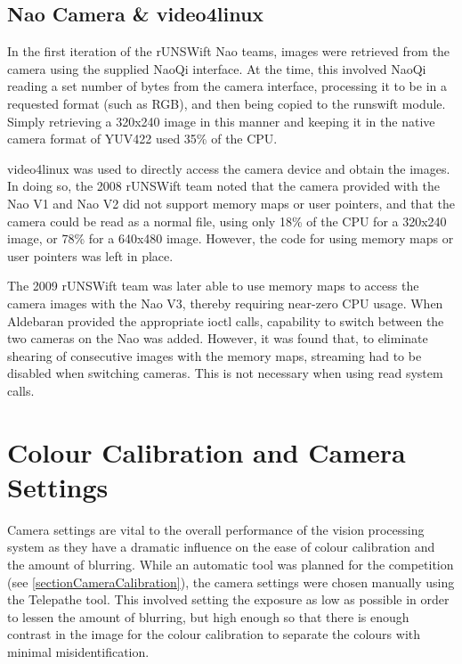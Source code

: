 \documentclass[pdftex,11pt,a4paper]{report}
\begin{document}
\begin{notesfornextyear}
\section{Nao Camera \& video4linux}
In the first iteration of the rUNSWift Nao teams, images were retrieved from
the camera using the supplied NaoQi interface.  At the time, this involved
NaoQi reading a set number of bytes from the camera interface, processing it to
be in a requested format (such as RGB), and then being copied to the
runswift module.  Simply retrieving a 320x240 image in this manner and keeping
it in the native camera format of YUV422 used 35\% of the CPU.

video4linux was used to directly access the camera device and obtain the
images.  In doing so, the 2008 rUNSWift team noted that the camera provided
with the Nao V1 and Nao V2 did not support memory maps or user pointers, and
that the camera could be read as a normal file, using only 18\% of the CPU for a
320x240 image, or 78\% for a 640x480 image. \cite{videodevice} However, the code
for using memory maps or user pointers was left in place.

The 2009 rUNSWift team was later able to use memory maps to access the camera
images with the Nao V3, thereby requiring near-zero CPU usage.  When Aldebaran
provided the appropriate ioctl calls, capability to switch between the two
cameras on the Nao was added.  However, it was found that, to eliminate
shearing of consecutive images with the memory maps, streaming had to be
disabled when switching cameras.  This is not necessary when using read
system calls.
\end{notesfornextyear}
\section{Colour Calibration and Camera Settings}
\label{sec:camcolcalib}
Camera settings are vital to the overall performance of the vision processing system as they have a dramatic influence on the ease of colour calibration and the amount of blurring. While an automatic tool was planned for the competition (see \autoref{sectionCameraCalibration}), the camera settings were chosen manually using the Telepathe tool. This involved setting the exposure as low as possible in order to lessen the amount of blurring, but high enough so that there is enough contrast in the image for the colour calibration to separate the colours with minimal misidentification. 
\end{document}
